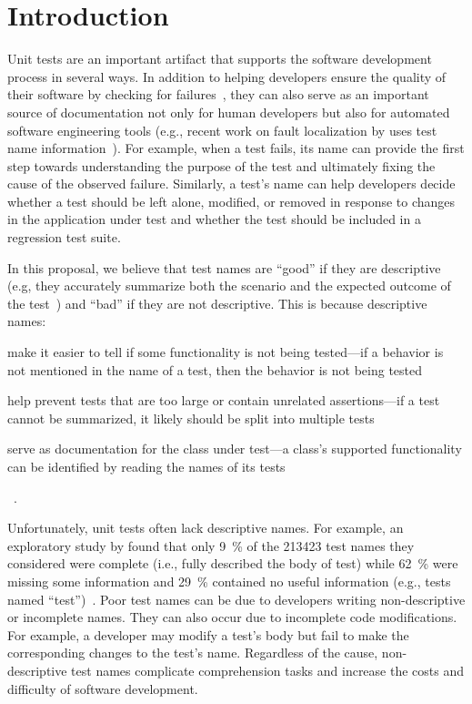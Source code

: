 \section{Introduction}
\label{sec:introduction}

Unit tests are an important artifact that supports the software development process in several ways.
In addition to helping developers ensure the quality of their software by checking for failures~\cite{daka2014survey}, they can also serve as an important source of documentation not only for human developers but also for automated software engineering tools (e.g., recent work on fault localization by \citeauthor{li2019deepfl} uses test name information~\cite{li2019deepfl}).
%
For example, when a test fails, its name can provide the first step towards understanding the purpose of the test and ultimately fixing the cause of the observed failure.
%
Similarly, a test's name can help developers decide whether a test should be left alone, modified, or removed in response to changes in the application under test and whether the test should be included in a regression test suite.


In this proposal, we believe that test names are \enquote{good} if they are descriptive (e.g, they accurately summarize both the scenario and the expected outcome of the test~\cite{trenk14}) and \enquote{bad} if they are not descriptive.
%
This is because descriptive names:
\begin{enumerate*}
\item make it easier to tell if some functionality is not being tested---if a behavior is not mentioned in the name of a test, then the behavior is not being tested
\item help prevent tests that are too large or contain unrelated assertions---if a test cannot be summarized, it likely should be split into multiple tests
\item serve as documentation for the class under test---a class's supported functionality can be identified by reading the names of its tests
\end{enumerate*}~\cite{zhang2015automatically}.


Unfortunately, unit tests often lack descriptive names.
%
For example, an exploratory study by \citeauthor{zhang2015automatically} found that only \SI{9}{\percent} of the \num{213423} test names they considered were complete (i.e., fully described the body of test) while \SI{62}{\percent} were missing some information and \SI{29}{\percent} contained no useful information (e.g., tests named \enquote{test})~\cite{zhang2015automatically}.
%
Poor test names can be due to developers writing non-descriptive or incomplete names.
%
They can also occur due to incomplete code modifications.
%
For example, a developer may modify a test's body but fail to make the corresponding changes to the test's name.
%
Regardless of the cause, non-descriptive test names complicate comprehension tasks and increase the costs and difficulty of software development.


